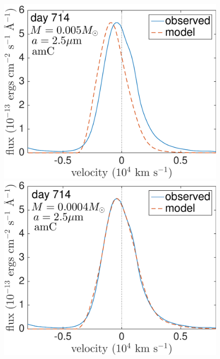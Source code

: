 \begin{figure}
\includegraphics[trim =0 30 0 0,clip=true,scale=0.34]{chapters/chapter5/images/silicates_take2/AmC_Dwek_Ha.pdf}
\hspace{3mm}
\includegraphics[trim =0 30 0 -10,clip=true,scale=0.34]{chapters/chapter5/images/silicates_take2/AmC_bestfit_Ha.pdf}


\end{figure}
